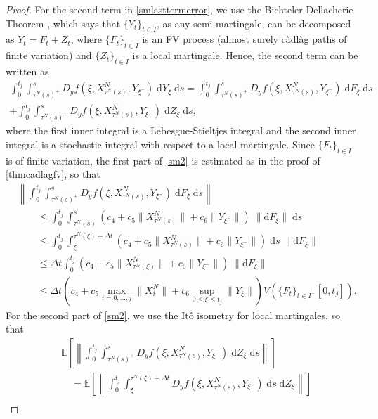 \documentclass[reqno,12pt]{amsart}
\theoremstyle{plain} %
\theoremstyle{definition} %
\begin{document}
\begin{proof}
    For the second term in \eqref{smlasttermerror}, we use the Bichteler-Dellacherie Theorem \cite[Theorem 47]{Protter2005}, which says that $\{Y_t\}_{t\in I}$, as any semi-martingale, can be decomposed as $Y_t = F_t + Z_t$, where $\{F_t\}_{t\in I}$ is an FV process (almost surely c\`adl\`ag paths of finite variation) and $\{Z_t\}_{t\in I}$ is a local martingale. Hence, the second term can be written as
    \begin{multline}
        \label{sm2}
        \int_0^{t_j} \int_{\tau^N(s)^+}^s D_y f(\xi, X_{\tau^N(s)}^N, Y_{\xi^-}) \;\mathrm{d}Y_\xi \;\mathrm{d}s = \int_0^{t_j} \int_{\tau^N(s)^+}^s D_y f(\xi, X_{\tau^N(s)}^N, Y_{\xi^-}) \;\mathrm{d}F_\xi \;\mathrm{d}s \\  
        + \int_0^{t_j} \int_{\tau^N(s)^+}^s D_y f(\xi, X_{\tau^N(s)}^N, Y_{\xi^-}) \;\mathrm{d}Z_\xi \;\mathrm{d}s,
    \end{multline}
    where the first inner integral is a Lebesgue-Stieltjes integral and the second inner integral is a stochastic integral with respect to a local martingale. Since $\{F_t\}_{t\in I}$ is of finite variation, the first part of \eqref{sm2} is estimated as in the proof of \cref{thmcadlagfv}, so that
    \begin{align*}
        & \left\|\int_0^{t_j} \int_{\tau^N(s)^+}^s D_y f(\xi, X_{\tau^N(s)}^N, Y_{\xi^-}) \;\mathrm{d}F_\xi\;\mathrm{d}s\right\| \\
        & \qquad \leq \int_0^{t_j} \int_{\tau^N(s)}^s \left(c_4 + c_5 \|X_{\tau^N(s)}^N\| + c_6\|Y_{\xi^-}\|\right)\;\|\mathrm{d}F_\xi\|\;\mathrm{d}s \\
        & \qquad \leq \int_0^{t_j} \int_{\xi}^{\tau^N(\xi) + \Delta t} \left(c_4 + c_5 \|X_{\tau^N(s)}^N\| + c_6\|Y_{\xi^-}\|\right)\;\mathrm{d}s\;\|\mathrm{d}F_\xi\| \\
        & \qquad \leq \Delta t \int_0^{t_j} \left(c_4 + c_5 \|X_{\tau^N(\xi)}^N\| + c_6\|Y_{\xi^-}\|\right)\;\|\mathrm{d}F_\xi\| \\
        & \qquad \leq \Delta t \left(c_4 + c_5 \max_{i=0, \ldots, j}\|X_{i}^N\| + c_6\sup_{0\leq \xi \leq t_j}\|Y_{\xi}\|\right)V(\{F_t\}_{t\in I}; [0, t_j]).
    \end{align*}
    For the second part of \eqref{sm2}, we use the It\^o isometry for local martingales, so that
    \begin{align*}
        & \mathbb{E}\left[\left\|\int_0^{t_j} \int_{\tau^N(s)^+}^s D_y f(\xi, X_{\tau^N(s)}^N, Y_{\xi^-}) \;\mathrm{d}Z_\xi\;\mathrm{d}s\right\|\right] \\
        & \quad = \mathbb{E}\left[\left\|\int_0^{t_j} \int_{\xi}^{\tau^N(\xi) + \Delta t} D_y f(\xi, X_{\tau^N(s)}^N, Y_{\xi^-}) \;\mathrm{d}s \;\mathrm{d}Z_\xi\right\|\right] \\

\end{align*}
\end{proof}
\end{document}
